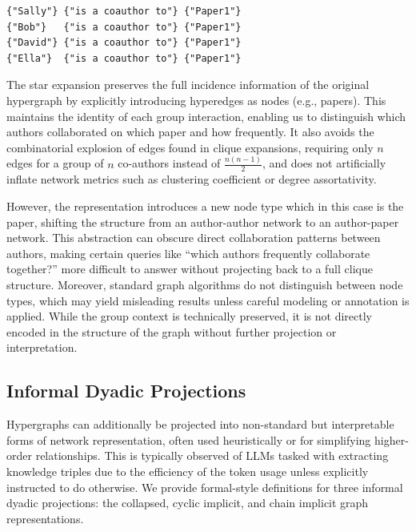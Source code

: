 \documentclass{article}
\begin{document}
\begin{verbatim}
{"Sally"} {"is a coauthor to"} {"Paper1"}
{"Bob"}   {"is a coauthor to"} {"Paper1"}
{"David"} {"is a coauthor to"} {"Paper1"}
{"Ella"}  {"is a coauthor to"} {"Paper1"}
\end{verbatim}

The star expansion preserves the full incidence information of the original hypergraph by explicitly introducing hyperedges as nodes (e.g., papers). This maintains the identity of each group interaction, enabling us to distinguish which authors collaborated on which paper and how frequently. It also avoids the combinatorial explosion of edges found in clique expansions, requiring only \( n \) edges for a group of \( n \) co-authors instead of \( \frac{n(n-1)}{2} \), and does not artificially inflate network metrics such as clustering coefficient or degree assortativity.

However, the representation introduces a new node type which in this case is the paper, shifting the structure from an author-author network to an author-paper network. This abstraction can obscure direct collaboration patterns between authors, making certain queries like “which authors frequently collaborate together?” more difficult to answer without projecting back to a full clique structure. Moreover, standard graph algorithms do not distinguish between node types, which may yield misleading results unless careful modeling or annotation is applied. While the group context is technically preserved, it is not directly encoded in the structure of the graph without further projection or interpretation.

\subsection*{Informal Dyadic Projections}

Hypergraphs can additionally be projected into non-standard but interpretable forms of network representation, often used heuristically or for simplifying higher-order relationships. This is typically observed of LLMs tasked with extracting knowledge triples due to the efficiency of the token usage unless explicitly instructed to do otherwise. We provide formal-style definitions for three informal dyadic projections: the collapsed, cyclic implicit, and chain implicit graph representations.

\vspace{4mm}
\end{document}
